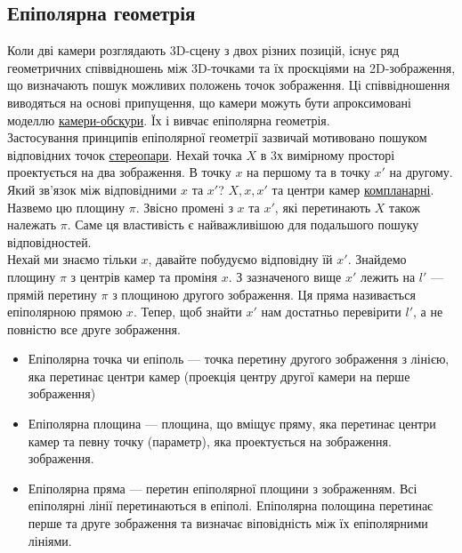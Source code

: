 \subsection{Епіполярна геометрія}
Коли дві камери розглядають 3D-сцену з двох різних позицій, існує ряд 
геометричних співвідношень між 3D-точками та їх проєкціями на 2D-зображення, 
що визначають пошук можливих положень точок зображення. Ці співвідношення 
виводяться на основі припущення, що камери можуть бути апроксимовані 
моделлю \href{https://en.wikipedia.org/wiki/Camera_obscura}{камери-обскури}. 
Їх і вивчає епіполярна геометрія. 
\\
\indent
Застосування принципів епіполярної геометрії зазвичай мотивовано пошуком
відповідних точок 
\href{https://uk.wikipedia.org/wiki/%D0%A1%D1%82%D0%B5%D1%80%D0%B5%D0%BE%D0%BF%D0%B0%D1%80%D0%B0}
{стереопари}. Нехай точка $X$ в 3х вимірному просторі проектується на два 
зображення. В точку $x$ на першому та в точку $x'$ на другому. Який зв'язок 
між відповідними $x$ та $x'$? $X, x, x'$ та центри камер 
\href{https://en.wikipedia.org/wiki/Coplanarity}{компланарні}. Назвемо цю 
площину $\pi$. Звісно промені з $x$ та $x'$, які перетинають $X$ також належать
$\pi$. Саме ця властивість є найважливішою для подальшого пошуку відповідностей.
\\\indent
Нехай ми знаємо тільки $x$, давайте побудуємо відповідну їй $x'$. Знайдемо 
площину $\pi$ з центрів камер та проміня $x$. З зазначеного вище $x'$ лежить на 
$l'$ --- прямій перетину $\pi$ з площиною другого зображення. Ця пряма 
називається епіполярною прямою $x$. Тепер, щоб знайти $x'$ нам достатньо 
перевірити $l'$, а не повністю все друге зображення.
\begin{itemize}
	\item{Епіполярна точка чи епіполь --- точка перетину другого зображення
з лінією, яка перетинає центри камер (проекція центру другої камери на перше 
зображення)}
    \item{Епіполярна площина --- площина, що вміщує пряму, яка перетинає центри 
камер та певну точку (параметр), яка проектується на зображення.
зображення. }
    \item{Епіполярна пряма --- перетин епіполярної площини з зображенням. Всі
епіполярні лінії перетинаються в епіполі. Епіполярна полощина перетинає перше 
та друге зображення та визначає віповідність між їх епіполярними лініями.}
\end{itemize}

